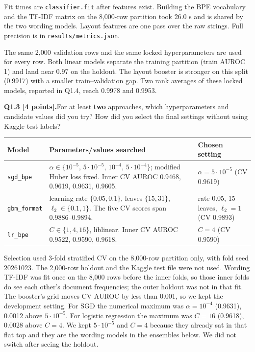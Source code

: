 \documentclass[11pt,letterpaper]{article}
\newcommand{\question}[2]{\needspace{4\baselineskip}\par\addvspace{0.45em}\noindent\textbf{#1}\quad #2\par\nobreak\vspace{0.1em}}
\newcommand{\smallnote}[1]{{\small\color{muted}#1}}
\begin{document}
\smallnote{Fit times are \texttt{classifier.fit} after features exist. Building the BPE vocabulary and the TF-IDF matrix on the 8{,}000-row partition took 26.0 s and is shared by the two wording models. Layout features are one pass over the raw strings. Full precision is in \texttt{results/metrics.json}.}

The same 2{,}000 validation rows and the same locked hyperparameters are used for every row. Both linear models separate the training partition (train AUROC 1) and land near 0.97 on the holdout. The layout booster is stronger on this split (0.9917) with a smaller train--validation gap. Two rank averages of these locked models, reported in Q1.4, reach 0.9978 and 0.9953.

\question{Q1.3 [4 points].}{For at least \textbf{two} approaches, which hyperparameters and candidate values did you try? How did you select the final settings without using Kaggle test labels?}
\begin{tabularx}{\linewidth}{@{}p{1.18in}Yp{1.55in}@{}}\toprule Model & Parameters/values searched & Chosen setting \\ \midrule
\texttt{sgd\_bpe} & $\alpha \in \{10^{-5},\,5\cdot10^{-5},\,10^{-4},\,5\cdot10^{-4}\}$; modified Huber loss fixed. Inner CV AUROC 0.9468, 0.9619, 0.9631, 0.9605. & $\alpha=5\cdot10^{-5}$ (CV 0.9619) \\
\texttt{gbm\_format} & learning rate $\{0.05,0.1\}$, leaves $\{15,31\}$, $\ell_2\in\{0.1,1\}$. The five CV scores span 0.9886--0.9894. & rate 0.05, 15 leaves, $\ell_2=1$ (CV 0.9893) \\
\texttt{lr\_bpe} & $C\in\{1,4,16\}$, liblinear. Inner CV AUROC 0.9522, 0.9590, 0.9618. & $C=4$ (CV 0.9590) \\
\bottomrule\end{tabularx}

Selection used 3-fold stratified CV on the 8{,}000-row partition only, with fold seed 20261023. The 2{,}000-row holdout and the Kaggle test file were not used. Wording TF-IDF was fit once on the 8{,}000 rows before the inner folds, so those inner folds do see each other's document frequencies; the outer holdout was not in that fit. The booster's grid moves CV AUROC by less than 0.001, so we kept the development setting. For SGD the numerical maximum was $\alpha=10^{-4}$ (0.9631), 0.0012 above $5\cdot10^{-5}$. For logistic regression the maximum was $C=16$ (0.9618), 0.0028 above $C=4$. We kept $5\cdot10^{-5}$ and $C=4$ because they already sat in that flat top and they are the wording models in the ensembles below. We did not switch after seeing the holdout.
\end{document}
